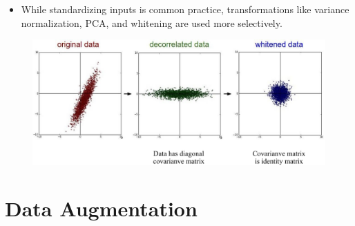 \documentclass[serif, aspectratio=169]{beamer}
\begin{document}
\begin{frame}
	\begin{itemize}
		\item While standardizing inputs is common practice, transformations like variance normalization, PCA, and whitening are used more selectively.
	\end{itemize}
	\begin{figure}[htpb]
		\begin{center}
			\includegraphics[keepaspectratio, scale=0.35]{pic/whiten}
		\end{center}
	\end{figure}	
\end{frame}

\section{Data Augmentation}
\end{document}
